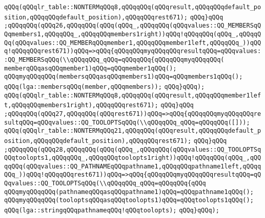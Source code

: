 \verb|qQQq(qQQqlr_table::NONTERMqQQq8,qQQqqQQq(qQQqresult,qQQqqQQqdefault_position,qQQqqQQqdefault_position),qQQqqQQqrest671);|\newline
\verb|qQQq}qQQq|\newline
\verb|;qQQqqQQq(qQQq26,qQQqqQQq(qQQq(qQQq_,qQQqqQQq(qQQqvalues::QQ_MEMBERSqQQqmembers1,qQQqqQQq_,qQQqqQQqmembers1right))qQQq!qQQqqQQq(qQQq_,qQQqqQQq(qQQqvalues::QQ_MEMBERqQQqmember1,qQQqqQQqmember1left,qQQqqQQq_))qQQq!qQQqqQQqrest671))qQQq=>qQQq{qQQqqQQqmyqQQqqQQqresultqQQq=qQQqvalues::QQ_MEMBERSqQQq(\\qQQqqQQq_qQQq=qQQqqQQq{qQQqqQQqmyqQQqqQQq(|\newline
\verb|memberqQQqasqQQqmember1)qQQq=qQQqmember1qQQq();|\newline
\verb|qQQqmyqQQqqQQq(membersqQQqasqQQqmembers1)qQQq=qQQqmembers1qQQq();|\newline
\verb|qQQq(lga::membersqQQq(member,qQQqmembers));|\newline
\verb|qQQq}qQQq);|\newline
\verb|qQQq(qQQqlr_table::NONTERMqQQq8,qQQqqQQq(qQQqresult,qQQqqQQqmember1left,qQQqqQQqmembers1right),qQQqqQQqrest671);|\newline
\verb|qQQq}qQQq|\newline
\verb|;qQQqqQQq(qQQq27,qQQqqQQq(qQQqrest671))qQQq=>qQQq{qQQqqQQqmyqQQqqQQqresultqQQq=qQQqvalues::QQ_TOOLOPTSqQQq(\\qQQqqQQq_qQQq=qQQqqQQq([]));|\newline
\verb|qQQq(qQQqlr_table::NONTERMqQQq21,qQQqqQQq(qQQqresult,qQQqqQQqdefault_position,qQQqqQQqdefault_position),qQQqqQQqrest671);|\newline
\verb|qQQq}qQQq|\newline
\verb|;qQQqqQQq(qQQq28,qQQqqQQq(qQQq(qQQq_,qQQqqQQq(qQQqvalues::QQ_TOOLOPTSqQQqtoolopts1,qQQqqQQq_,qQQqqQQqtoolopts1right))qQQq!qQQqqQQq(qQQq_,qQQqqQQq(qQQqvalues::QQ_PATHNAMEqQQqpathname1,qQQqqQQqpathname1left,qQQqqQQq_))qQQq!qQQqqQQqrest671))qQQq=>qQQq{qQQqqQQqmyqQQqqQQqresultqQQq=qQQqvalues::QQ_TOOLOPTSqQQq(\\qQQqqQQq_qQQq=qQQqqQQq{qQQq|\newline
\verb|qQQqmyqQQqqQQq(pathnameqQQqasqQQqpathname1)qQQq=qQQqpathname1qQQq();|\newline
\verb|qQQqmyqQQqqQQq(tooloptsqQQqasqQQqtoolopts1)qQQq=qQQqtoolopts1qQQq();|\newline
\verb|qQQq(lga::stringqQQqpathnameqQQq!qQQqtoolopts);|\newline
\verb|qQQq}qQQq);|\newline
